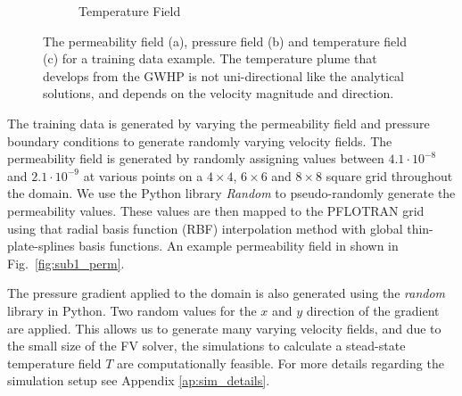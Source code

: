 \documentclass{article} %
\begin{document}
\begin{figure}[!htb]
\begin{subfigure}{.33\textwidth}
  \caption{Temperature Field}
  \label{fig:sub1_temp}
\end{subfigure}%
\caption{The permeability field (a), pressure field (b) and temperature field (c) for a training data example. The temperature plume that develops from the GWHP is not uni-directional like the analytical solutions, and depends on the velocity magnitude and direction.}
\label{fig:data_example}
\end{figure}




The training data is generated by varying the permeability field and pressure boundary conditions to generate randomly varying velocity fields.
The permeability field is generated by randomly assigning values between $4.1 \cdot 10^{-8}$ and $2.1 \cdot 10^{-9}$ at various points on a $4 \times 4$, $6 \times 6$ and $8 \times 8$ square grid throughout the domain. We use the Python library \textit{Random} to pseudo-randomly generate the permeability values. These values are then mapped to the PFLOTRAN grid using that radial basis function (RBF) interpolation method with global thin-plate-splines basis functions.
An example permeability field in shown in Fig.~\ref{fig:sub1_perm}.

The pressure gradient applied to the domain is also generated using the \textit{random} library in Python. Two random values for the $x$ and $y$ direction of the gradient are applied.
This allows us to generate many varying velocity fields, and due to the small size of the FV solver, the simulations to calculate a stead-state temperature field $T$ are computationally feasible.
For more details regarding the simulation setup see Appendix \ref{ap:sim_details}.
\end{document}
